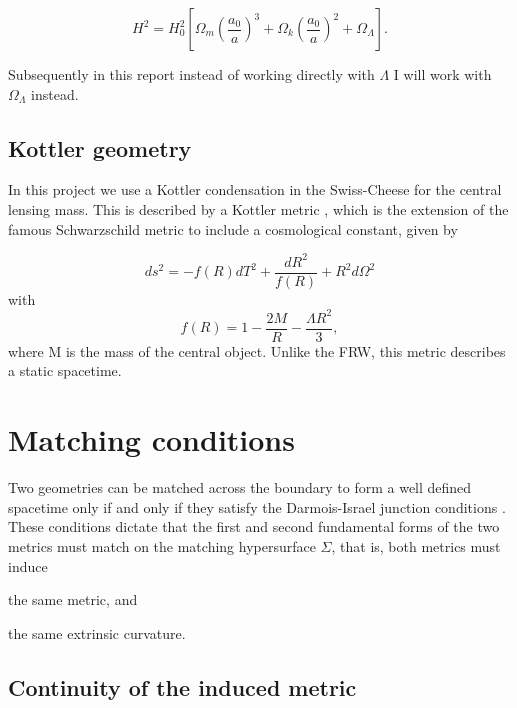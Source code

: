 \begin{equation}
  H^2 = H_0^2 \left [ \Omega_m \left ( \frac{a_0}{a}\right )^3 + \Omega_k \left ( \frac{a_0}{a}\right )^2 + \Omega_{\Lambda} \right ]. 
  \label{eq:friedmann-eqn-version2}
\end{equation}

Subsequently in this report instead of working directly with $\Lambda$ I will work with $\Omega_{\Lambda}$ instead. 

\subsection{Kottler geometry}

In this project we use a Kottler condensation in the Swiss-Cheese for the central lensing mass. This is described by a Kottler metric \citep{kottler1918physikalischen}, which is the extension of the famous Schwarzschild metric to include a cosmological constant, given by

\begin{equation}
  ds^2 = -f(R)dT^2 + \frac{dR^2}{f(R)} + R^2 d \Omega^2
  \label{eq:kottler-metric}
\end{equation}
with
\begin{equation}
  f(R) = 1-\frac{2M}{R} - \frac{\Lambda R^2}{3},
  \label{eq:kottler-metric-f}
\end{equation}
where M is the mass of the central object. Unlike the FRW, this metric describes a static spacetime. 

\section{Matching conditions}

Two geometries can be matched across the boundary to form a well defined spacetime only if and only if they satisfy the Darmois-Israel junction conditions \citep{darmois1927equations,israel1966singular}. These conditions dictate that the first and second fundamental forms of the two metrics must match on the matching hypersurface $\Sigma$, that is, both metrics must induce 
\begin{inparaenum}[(i)]
  \item the same metric, and 
  \item the same extrinsic curvature.
\end{inparaenum}

\subsection{Continuity of the induced metric}

